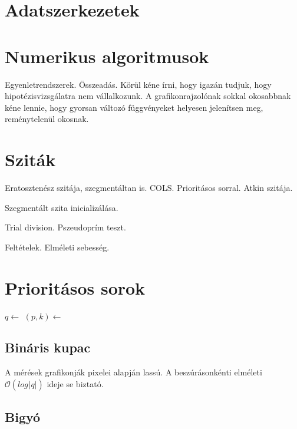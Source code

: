 \section{Adatszerkezetek}

\section{Numerikus algoritmusok}

Egyenletrendszerek. Összeadás.
Körül kéne írni, hogy igazán tudjuk, hogy hipotézisvizsgálatra nem vállalkozunk.
A grafikonrajzolónak sokkal okosabbnak kéne lennie, hogy gyorsan változó függvényeket
helyesen jelenítsen meg, reménytelenül okosnak.

\section{Sziták}

Eratosztenész szitája, szegmentáltan is. COLS. Prioritásos sorral. Atkin szitája.

Szegmentált szita inicializálása.

Trial division. Pszeudoprím teszt.

Feltételek. Elméleti sebesség.

\section{Prioritásos sorok}

\begin{algorithmic}[1]
\State $q \gets$ 
		\State $(p, k) \gets $ 
		\State {}
		\State {}
	\EndWhile
		\State {}
	\EndIf
\EndFor
\end{algorithmic}

\subsection{Bináris kupac}

A mérések grafikonják pixelei alapján lassú. A beszúrásonkénti elméleti
$\mathcal{O}(log_{}{|q|})$ ideje se biztató.

\subsection{Bigyó} %

